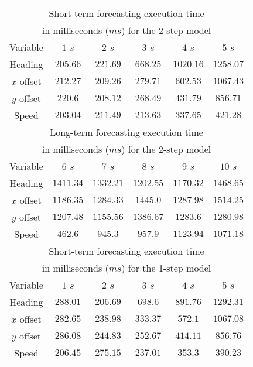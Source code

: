 \documentclass[preprint,12pt]{elsarticle}
\begin{document}
\begin{table}[!ht]
	\centering
	\begin{tabular}{|c|c|c|c|c|c|}
        \hline
        \multicolumn{6}{|c|}{Short-term forecasting execution time} \\
        \multicolumn{6}{|c|}{in milliseconds ($ms$) for the 2-step model} \\ \hline
        Variable & $1$ $s$ & $2$ $s$ & $3$ $s$ & $4$ $s$ & $5$ $s$ \\ \hline
        Heading & $205.66$ & $221.69$ & $668.25$ & $1020.16$ & $1258.07$ \\ \hline
        $x$ offset & $212.27$ & $209.26$ & $279.71$ & $602.53$ & $1067.43$ \\ \hline
        $y$ offset & $220.6$ & $208.12$ & $268.49$ & $431.79$ & $856.71$ \\ \hline
        Speed & $203.04$ & $211.49$ & $213.63$ & $337.65$ & $421.28$ \\ \hline
        \multicolumn{6}{|c|}{Long-term forecasting execution time} \\
        \multicolumn{6}{|c|}{in milliseconds ($ms$) for the 2-step model} \\ \hline
        Variable & $6$ $s$ & $7$ $s$ & $8$ $s$ & $9$ $s$ & $10$ $s$ \\ \hline
        Heading & $1411.34$ & $1332.21$ & $1202.55$ & $1170.32$ & $1468.65$ \\ \hline
        $x$ offset & $1186.35$ & $1284.33$ & $1445.0$ & $1287.98$ & $1514.25$ \\ \hline
        $y$ offset & $1207.48$ & $1155.56$ & $1386.67$ & $1283.6$ & $1280.98$ \\ \hline
        Speed & $462.6$ & $945.3$ & $957.9$ & $1123.94$ & $1071.18$ \\ \hline
        \multicolumn{6}{|c|}{Short-term forecasting execution time} \\
        \multicolumn{6}{|c|}{in milliseconds ($ms$) for the 1-step model} \\ \hline
        Variable & $1$ $s$ & $2$ $s$ & $3$ $s$ & $4$ $s$ & $5$ $s$ \\ \hline
        Heading & $288.01$ & $206.69$ & $698.6$ & $891.76$ & $1292.31$ \\ \hline
        $x$ offset & $282.65$ & $238.98$ & $333.37$ & $572.1$ & $1067.08$ \\ \hline
        $y$ offset & $286.08$ & $244.83$ & $252.67$ & $414.11$ & $856.76$ \\ \hline
        Speed & $206.45$ & $275.15$ & $237.01$ & $353.3$ & $390.23$ \\ \hline

\end{tabular}
\end{table}
\end{document}
